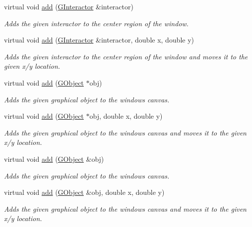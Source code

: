 \begin{DoxyCompactItemize}
virtual void \mbox{\hyperlink{classGWindow_a33b08fe5428ed634a658deab076099f7}{add}} (\mbox{\hyperlink{classGInteractor}{G\+Interactor}} \&interactor)
\begin{DoxyCompactList}\small\item\em Adds the given interactor to the center region of the window. \end{DoxyCompactList}\item 
virtual void \mbox{\hyperlink{classGWindow_a56840f453f9938083c24c7fb1a4c377e}{add}} (\mbox{\hyperlink{classGInteractor}{G\+Interactor}} \&interactor, double x, double y)
\begin{DoxyCompactList}\small\item\em Adds the given interactor to the center region of the window and moves it to the given x/y location. \end{DoxyCompactList}\item 
virtual void \mbox{\hyperlink{classGWindow_a2327d64402837eedd533c098014e46d9}{add}} (\mbox{\hyperlink{classGObject}{G\+Object}} $\ast$obj)
\begin{DoxyCompactList}\small\item\em Adds the given graphical object to the window\textquotesingle{}s canvas. \end{DoxyCompactList}\item 
virtual void \mbox{\hyperlink{classGWindow_ab5388ece7a50b46e0ee72e11fe202609}{add}} (\mbox{\hyperlink{classGObject}{G\+Object}} $\ast$obj, double x, double y)
\begin{DoxyCompactList}\small\item\em Adds the given graphical object to the window\textquotesingle{}s canvas and moves it to the given x/y location. \end{DoxyCompactList}\item 
virtual void \mbox{\hyperlink{classGWindow_a7f596867e2d8f9dfb816b3d496ea074f}{add}} (\mbox{\hyperlink{classGObject}{G\+Object}} \&obj)
\begin{DoxyCompactList}\small\item\em Adds the given graphical object to the window\textquotesingle{}s canvas. \end{DoxyCompactList}\item 
virtual void \mbox{\hyperlink{classGWindow_ac302bb932e3905e5d368ce735ad8444c}{add}} (\mbox{\hyperlink{classGObject}{G\+Object}} \&obj, double x, double y)
\begin{DoxyCompactList}\small\item\em Adds the given graphical object to the window\textquotesingle{}s canvas and moves it to the given x/y location. \end{DoxyCompactList}\item 

\end{DoxyCompactItemize}

